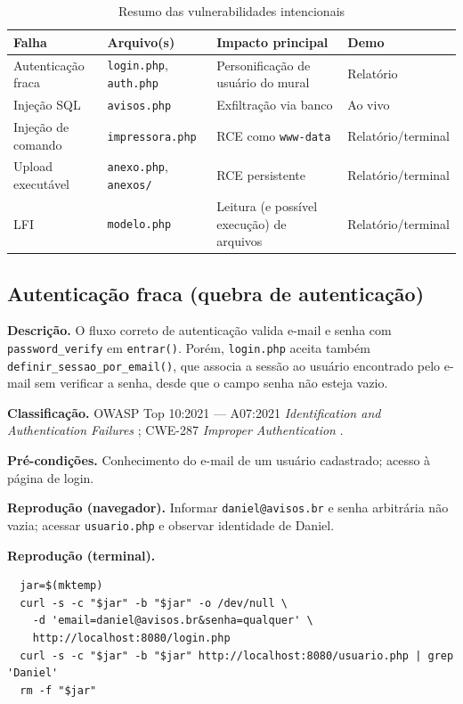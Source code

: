   \begin{table}[h]
  \centering
  \caption{Resumo das vulnerabilidades intencionais}
  \label{tab:resumo}
  \begin{tabular}{@{}p{3.2cm}p{3.5cm}p{4.5cm}p{2.8cm}@{}}
  \toprule
  \textbf{Falha} & \textbf{Arquivo(s)} & \textbf{Impacto principal} & \textbf{Demo} \\
  \midrule
  Autenticação fraca & \texttt{login.php}, \texttt{auth.php} & Personificação de usuário do mural & Relatório \\
  Injeção SQL & \texttt{avisos.php} & Exfiltração via banco & Ao vivo \\
  Injeção de comando & \texttt{impressora.php} & RCE como \texttt{www-data} & Relatório/terminal \\
  Upload executável & \texttt{anexo.php}, \texttt{anexos/} & RCE persistente & Relatório/terminal \\
  LFI & \texttt{modelo.php} & Leitura (e possível execução) de arquivos & Relatório/terminal \\
  \bottomrule
  \end{tabular}
  \end{table}
  
  \subsection{Autenticação fraca (quebra de autenticação)}
  
  \textbf{Descrição.} O fluxo correto de autenticação valida e-mail e senha com
  \texttt{password\_verify} em \texttt{entrar()}. Porém, \texttt{login.php} aceita também
  \texttt{definir\_sessao\_por\_email()}, que associa a sessão ao usuário encontrado pelo e-mail
  sem verificar a senha, desde que o campo senha não esteja vazio.
  
  \textbf{Classificação.} OWASP Top 10:2021 --- A07:2021 \emph{Identification and Authentication Failures}
  \cite{owasp}; CWE-287 \emph{Improper Authentication} \cite{cwe}.
  
  \textbf{Pré-condições.} Conhecimento do e-mail de um usuário cadastrado; acesso à página de login.
  
  \textbf{Reprodução (navegador).} Informar \texttt{daniel@avisos.br} e senha arbitrária não
  vazia; acessar \texttt{usuario.php} e observar identidade de Daniel.
  
  \textbf{Reprodução (terminal).}
  \begin{lstlisting}
  jar=$(mktemp)
  curl -s -c "$jar" -b "$jar" -o /dev/null \
    -d 'email=daniel@avisos.br&senha=qualquer' \
    http://localhost:8080/login.php
  curl -s -c "$jar" -b "$jar" http://localhost:8080/usuario.php | grep 'Daniel'
  rm -f "$jar"
  \end{lstlisting}
  
